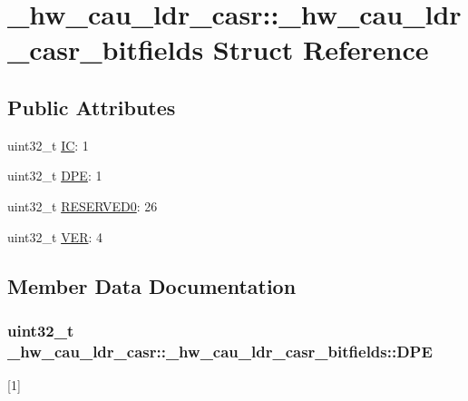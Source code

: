 \hypertarget{struct__hw__cau__ldr__casr_1_1__hw__cau__ldr__casr__bitfields}{}\section{\+\_\+hw\+\_\+cau\+\_\+ldr\+\_\+casr\+:\+:\+\_\+hw\+\_\+cau\+\_\+ldr\+\_\+casr\+\_\+bitfields Struct Reference}
\label{struct__hw__cau__ldr__casr_1_1__hw__cau__ldr__casr__bitfields}
\subsection*{Public Attributes}
\begin{DoxyCompactItemize}
\item 
uint32\+\_\+t \hyperlink{struct__hw__cau__ldr__casr_1_1__hw__cau__ldr__casr__bitfields_aa8c0a2b0adc9d892d1056d3a66f7b8e1}{IC}\+: 1
\item 
uint32\+\_\+t \hyperlink{struct__hw__cau__ldr__casr_1_1__hw__cau__ldr__casr__bitfields_a4c01b760894fce57b3385a559298a478}{D\+PE}\+: 1
\item 
uint32\+\_\+t \hyperlink{struct__hw__cau__ldr__casr_1_1__hw__cau__ldr__casr__bitfields_ade822da702feb113eac29536061fd5aa}{R\+E\+S\+E\+R\+V\+E\+D0}\+: 26
\item 
uint32\+\_\+t \hyperlink{struct__hw__cau__ldr__casr_1_1__hw__cau__ldr__casr__bitfields_ac9de20f20517d942eaf3b88da632478d}{V\+ER}\+: 4
\end{DoxyCompactItemize}


\subsection{Member Data Documentation}
\subsubsection[{\texorpdfstring{D\+PE}{DPE}}]{\setlength{\rightskip}{0pt plus 5cm}uint32\+\_\+t \+\_\+hw\+\_\+cau\+\_\+ldr\+\_\+casr\+::\+\_\+hw\+\_\+cau\+\_\+ldr\+\_\+casr\+\_\+bitfields\+::\+D\+PE}\hypertarget{struct__hw__cau__ldr__casr_1_1__hw__cau__ldr__casr__bitfields_a4c01b760894fce57b3385a559298a478}{}\label{struct__hw__cau__ldr__casr_1_1__hw__cau__ldr__casr__bitfields_a4c01b760894fce57b3385a559298a478}
\mbox{[}1\mbox{]} 
